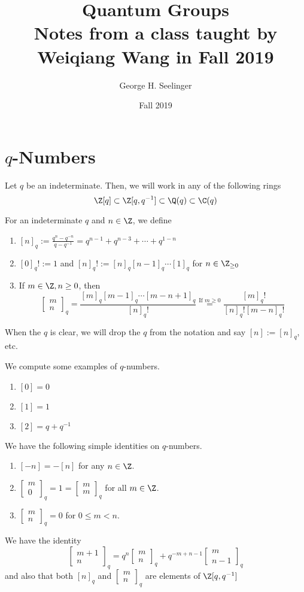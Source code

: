 \documentclass[11pt,leqno,oneside]{amsbook}
\title[Quantum Groups]{Quantum Groups \\ Notes
  from a class taught by Weiqiang Wang in Fall 2019}
\author{George H. Seelinger}
\date{Fall 2019}
\numberwithin{thm}{section}
\newcommand{\qfactorial}[1]{[#1]_q!}
\newcommand{\qbinom}[3][q]{\left[\begin{array}{c}#2\\#3\end{array}\right]_{#1}}
\begin{document}
\maketitle
\section{\(q\)-Numbers}
Let \(q\) be an indeterminate. Then, we will work in any of the
following rings \[
  \Z[q] \subset \Z[q,q^{-1}] \subset \Q(q) \subset \C(q)
\]
\begin{defn}
  For an indeterminate \(q\) and \(n \in \Z\), we define
  \begin{enumerate}
  \item \([n]_q := \frac{q^n-q^{-n}}{q-q^{-1}} = q^{n-1} + q^{n-3} +
    \cdots + q^{1-n}\)
  \item \(\qfactorial{0} := 1\) and \(\qfactorial{n} := [n]_q [n-1]_q
    \cdots [1]_q\) for \(n \in \Z_{\geq 0}\)
  \item If \(m \in \Z, n \geq 0\), then \[
      \qbinom{m}{n} = \frac{[m]_q [m-1]_q \cdots
        [m-n+1]_q}{\qfactorial{n}} \overset{\text{If }m \geq 0}{=} \frac{\qfactorial{m}}{\qfactorial{n}\qfactorial{m-n}}
    \]
  \end{enumerate}
\end{defn}
\begin{rmk}
  When the \(q\) is clear, we will drop the \(q\) from the notation
  and say \([n] := [n]_q\), etc.
\end{rmk}
\begin{example}
  We compute some examples of \(q\)-numbers.
  \begin{enumerate}
  \item \([0] = 0\)
  \item \([1] = 1\)
  \item \([2] = q+q^{-1}\)
  \end{enumerate}
\end{example}
\begin{prop}
  We have the following simple identities on \(q\)-numbers.
  \begin{enumerate}
  \item \([-n] = -[n]\) for any \(n \in \Z\).
  \item \(\qbinom{m}{0} = 1 = \qbinom{m}{m}\) for all \(m \in \Z\).
  \item \(\qbinom{m}{n} = 0\) for \(0 \leq m < n\).
  \end{enumerate}
\end{prop}
\begin{prop}
  We have the identity \[
    \qbinom{m+1}{n} = q^n \qbinom{m}{n} + q^{-m+n-1} \qbinom{m}{n-1}
  \]
  and also that both \([n]_q\) and \(\qbinom{m}{n}\) are elements of
  \(\Z[q,q^{-1}]\) 
\end{prop}
\end{document}
